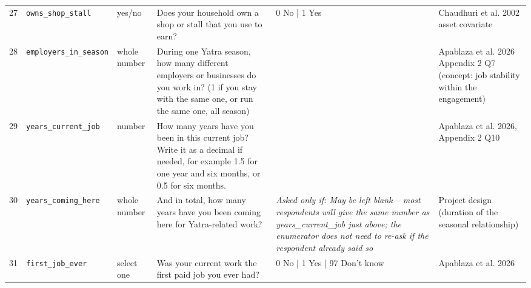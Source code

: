 \documentclass[9pt,a4paper,landscape]{article}
\begin{document}
\begin{longtable}{@{}p{0.5cm}p{3.3cm}p{1.7cm}p{7.3cm}p{5.6cm}p{5.4cm}@{}}
\footnotesize 27 & \footnotesize\texttt{owns\_shop\_stall} & \scriptsize yes/no & \footnotesize Does your household own a shop or stall that you use to earn?\par\vspace{1pt}{\footnotesize\color{hdr}{\hifont क्या आपके घर की अपनी दुकान या खोखा है जिससे आप कमाते हैं?}} & \scriptsize 0 No | 1 Yes & \scriptsize Chaudhuri et al. 2002 asset covariate\\
\footnotesize 28 & \footnotesize\texttt{employers\_in\_season} & \scriptsize whole number & \footnotesize During one Yatra season, how many different employers or businesses do you work in? (1 if you stay with the same one, or run the same one, all season)\par\vspace{1pt}{\footnotesize\color{hdr}{\hifont एक यात्रा सीज़न में आप कितने अलग-अलग मालिकों के पास या कितने अलग-अलग कामों में काम करते हैं? (अगर पूरे सीज़न एक ही जगह रहते हैं या अपना एक ही काम चलाते हैं, तो 1 लिखें)}} & \scriptsize  & \scriptsize Apablaza et al. 2026 Appendix 2 Q7 (concept: job stability within the engagement)\\
\footnotesize 29 & \footnotesize\texttt{years\_current\_job} & \scriptsize number & \footnotesize How many years have you been in this current job? Write it as a decimal if needed, for example 1.5 for one year and six months, or 0.5 for six months.\par\vspace{1pt}{\footnotesize\color{hdr}{\hifont अगर एक साल या ज़्यादा: आप इस काम में कितने साल से हैं? दशमलव में लिखें, जैसे डेढ़ साल के लिए 1.5।}} & \scriptsize  & \scriptsize Apablaza et al. 2026, Appendix 2 Q10\\
\footnotesize 30 & \footnotesize\texttt{years\_coming\_here} & \scriptsize whole number & \footnotesize And in total, how many years have you been coming here for Yatra-related work?\par\vspace{1pt}{\footnotesize\color{hdr}{\hifont और कुल मिलाकर, आप कितने सालों से यहाँ यात्रा से जुड़ा काम करने आ रहे हैं? (अगर पिछले सवाल जैसा ही जवाब है, तो वही लिख सकते हैं)}} & \scriptsize \textit{Asked only if: May be left blank -- most respondents will give the same number as years\_current\_job just above; the enumerator does not need to re-ask if the respondent already said so} & \scriptsize Project design (duration of the seasonal relationship)\\
\footnotesize 31 & \footnotesize\texttt{first\_job\_ever} & \scriptsize select one & \footnotesize Was your current work the first paid job you ever had?\par\vspace{1pt}{\footnotesize\color{hdr}{\hifont क्या यह आपका पहला पैसे वाला काम है?}} & \scriptsize 0 No | 1 Yes | 97 Don't know & \scriptsize Apablaza et al. 2026\\

\end{longtable}
\end{document}

